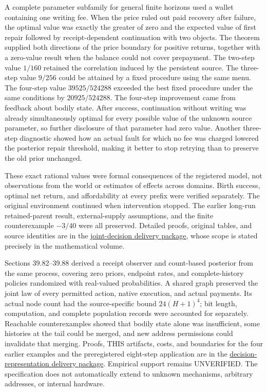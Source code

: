 \documentclass[
  english,
  11pt,
  oneside]{book}
\begin{document}
A complete parameter subfamily for general finite horizons used a wallet containing one writing fee. When the price ruled out paid recovery after failure, the optimal value was exactly the greater of zero and the expected value of first repair followed by receipt-dependent continuation with two objects. The theorem supplied both directions of the price boundary for positive returns, together with a zero-value result when the balance could not cover prepayment. The two-step value \(1/160\) retained the correlation induced by the persistent source. The three-step value \(9/256\) could be attained by a fixed procedure using the same menu. The four-step value \(39525/524288\) exceeded the best fixed procedure under the same conditions by \(20925/524288\). The four-step improvement came from feedback about bodily state. After success, continuation without writing was already simultaneously optimal for every possible value of the unknown source parameter, so further disclosure of that parameter had zero value. Another three-step diagnostic showed how an actual fault for which no fee was charged lowered the posterior repair threshold, making it better to stop retrying than to preserve the old prior unchanged.

These exact rational values were formal consequences of the registered model, not observations from the world or estimates of effects across domains. Birth success, optimal net return, and affordability at every prefix were verified separately. The original environment continued when intervention stopped. The earlier long-run retained-parent result, external-supply assumptions, and the finite counterexample \(-3/40\) were all preserved. Detailed proofs, original tables, and source identities are in the \href{https://github.com/MurphyHoops/UEOT/blob/3d443ec29eb17af1fc00699a74e2d42d73516d81/formalization/ueot-core/docs/compression/theory_completion/unified_closure/joint_decision_closure_v1/README.md}{joint-decision delivery package}, whose scope is stated precisely in the mathematical volume.

Sections 39.82--39.88 derived a receipt observer and count-based posterior from the same process, covering zero priors, endpoint rates, and complete-history policies randomized with real-valued probabilities. A shared graph preserved the joint law of every permitted action, native execution, and actual payments. Its actual node count had the source-specific bound \(24(H+1)^4\); bit length, computation, and complete population records were accounted for separately. Reachable counterexamples showed that bodily state alone was insufficient, some histories at the tail could be merged, and new address permissions could invalidate that merging. Proofs, THIS artifacts, costs, and boundaries for the four earlier examples and the preregistered eight-step application are in the \href{https://github.com/MurphyHoops/UEOT/blob/3d443ec29eb17af1fc00699a74e2d42d73516d81/formalization/ueot-core/docs/compression/theory_completion/unified_closure/decision_representation_closure_v1/README.md}{decision-representation delivery package}. Empirical support remains UNVERIFIED. The specification does not automatically extend to unknown mechanisms, arbitrary addresses, or internal hardware.
\end{document}
